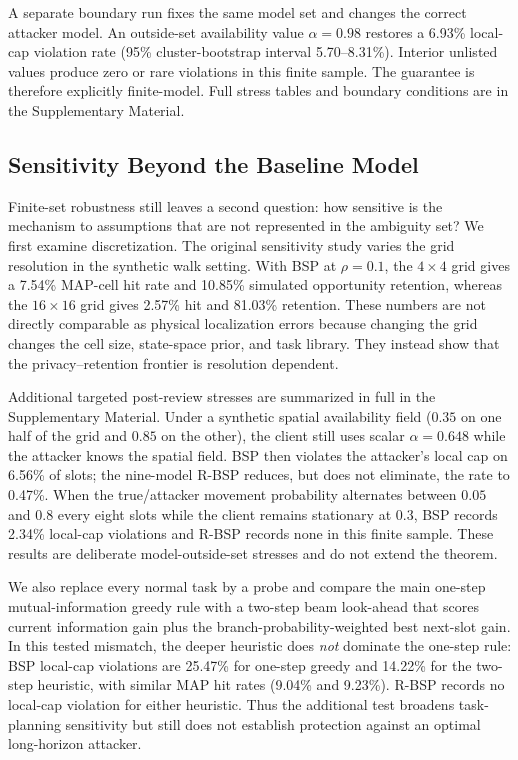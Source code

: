 \documentclass[10pt,journal,compsoc]{IEEEtran}
\begin{document}
A separate boundary run fixes the same model set and changes the correct attacker model. An outside-set availability value \(\alpha=0.98\) restores a 6.93\% local-cap violation rate (95\% cluster-bootstrap interval 5.70--8.31\%). Interior unlisted values produce zero or rare violations in this finite sample. The guarantee is therefore explicitly finite-model. Full stress tables and boundary conditions are in the Supplementary Material.

\subsection{Sensitivity Beyond the Baseline Model}
Finite-set robustness still leaves a second question: how sensitive is the mechanism to assumptions that are not represented in the ambiguity set? We first examine discretization. The original sensitivity study varies the grid resolution in the synthetic walk setting. With BSP at $\rho=0.1$, the $4\times4$ grid gives a 7.54\% MAP-cell hit rate and 10.85\% simulated opportunity retention, whereas the $16\times16$ grid gives 2.57\% hit and 81.03\% retention. These numbers are not directly comparable as physical localization errors because changing the grid changes the cell size, state-space prior, and task library. They instead show that the privacy--retention frontier is resolution dependent.

Additional targeted post-review stresses are summarized in full in the Supplementary Material. Under a synthetic spatial availability field ($0.35$ on one half of the grid and $0.85$ on the other), the client still uses scalar $\alpha=0.648$ while the attacker knows the spatial field. BSP then violates the attacker's local cap on 6.56\% of slots; the nine-model R-BSP reduces, but does not eliminate, the rate to 0.47\%. When the true/attacker movement probability alternates between $0.05$ and $0.8$ every eight slots while the client remains stationary at $0.3$, BSP records 2.34\% local-cap violations and R-BSP records none in this finite sample. These results are deliberate model-outside-set stresses and do not extend the theorem.

We also replace every normal task by a probe and compare the main one-step mutual-information greedy rule with a two-step beam look-ahead that scores current information gain plus the branch-probability-weighted best next-slot gain. In this tested mismatch, the deeper heuristic does \emph{not} dominate the one-step rule: BSP local-cap violations are 25.47\% for one-step greedy and 14.22\% for the two-step heuristic, with similar MAP hit rates (9.04\% and 9.23\%). R-BSP records no local-cap violation for either heuristic. Thus the additional test broadens task-planning sensitivity but still does not establish protection against an optimal long-horizon attacker.
\end{document}
